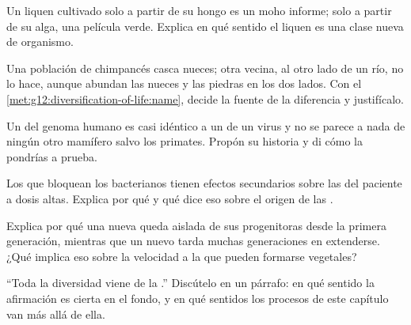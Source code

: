 \begin{exercise}[$\star\star$]\label{exo:g12:diversification-of-life:10}
Un liquen cultivado solo a partir de su hongo es un moho informe; solo
a partir de su alga, una película verde. Explica en qué sentido el
liquen es una clase nueva de organismo.
\end{exercise}

\begin{exercise}[$\star\star$]\label{exo:g12:diversification-of-life:11}
Una población de chimpancés casca nueces; otra vecina, al otro lado de
un río, no lo hace, aunque abundan las nueces y las piedras en los dos
lados. Con el \cref{met:g12:diversification-of-life:name}, decide la
fuente de la diferencia y justifícalo.
\end{exercise}

\begin{exercise}[$\star\star\star$]\label{exo:g12:diversification-of-life:12}
Un  del genoma humano es casi idéntico a un  de un virus y no se
parece a nada de ningún otro mamífero salvo los primates. Propón su
historia y di cómo la pondrías a prueba.
\end{exercise}

\begin{exercise}[$\star\star\star$]\label{exo:g12:diversification-of-life:13}
Los  que bloquean los  bacterianos tienen efectos
secundarios sobre las  del paciente a dosis altas. Explica
por qué y qué dice eso sobre el origen de las .
\end{exercise}

\begin{exercise}[$\star\star\star$]\label{exo:g12:diversification-of-life:14}
Explica por qué una   nueva queda aislada de sus
progenitoras desde la primera generación, mientras que un  nuevo
tarda muchas generaciones en extenderse. ¿Qué implica eso sobre la
velocidad a la que pueden formarse  vegetales?
\end{exercise}

\begin{exercise}[$\star\star\star$]\label{exo:g12:diversification-of-life:15}
``Toda la diversidad viene de la .'' Discútelo en un párrafo:
en qué sentido la afirmación es cierta en el fondo, y en qué sentidos
los procesos de este capítulo van más allá de ella.
\end{exercise}

